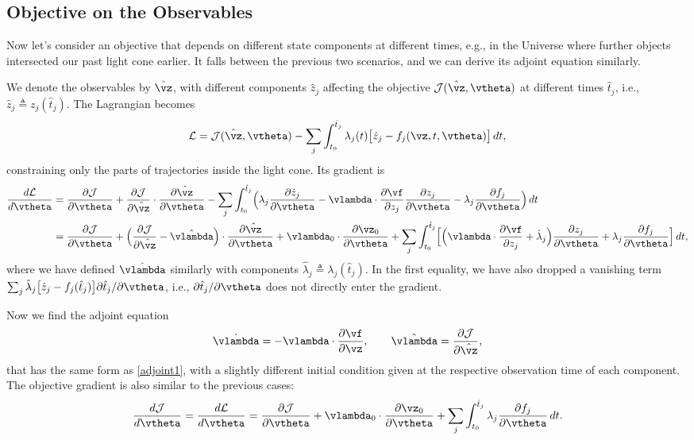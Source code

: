 \documentclass[modern, dvipsnames]{aastex631}
\renewcommand{\d}{d}
\newcommand{\p}{\partial}
\newcommand{\cJ}{\mathcal{J}}
\newcommand{\cL}{\mathcal{L}}
\begin{document}
\vspace{1em}
\subsection{Objective on the Observables}
\label{sec:lightcone}

Now let's consider an objective that depends on different state
components at different times, e.g., in the Universe where further
objects intersected our past light cone earlier.
It falls between the previous two scenarios, and we can derive its
adjoint equation similarly.

We denote the observables by $\hat\vz$, with different components $\hat
z_j$ affecting the objective $\cJ(\hat\vz, \vtheta)$ at different times
$\hat t_j$, i.e., $\hat z_j \triangleq z_j(\hat t_j)$.
The Lagrangian becomes
%
\begin{equation}
\cL = \cJ(\hat\vz, \vtheta)
- \sum_j \int_{t_0}^{\hat t_j} \lambda_j(t)
  \bigl[ \dot z_j - f_j(\vz, t, \vtheta) \bigr] \, \d t,
\end{equation}
%
constraining only the parts of trajectories inside the light cone.
Its gradient is
%
\begin{align}
\frac{\d\cL}{\d\vtheta}
&= \frac{\p\cJ}{\p\vtheta}
+ \frac{\p\cJ}{\p\hat\vz} \cdot \frac{\p\hat\vz}{\p\vtheta}
- \sum_j \int_{t_0}^{\hat t_j}
  \Bigl( \lambda_j \frac{\p\dot z_j}{\p\vtheta}
    - \vlambda \cdot \frac{\p\vf}{\p z_j} \frac{\p z_j}{\p\vtheta}
    - \lambda_j \frac{\p f_j}{\p\vtheta} \Bigr) \, \d t \\
%
&= \frac{\p\cJ}{\p\vtheta}
+ \Bigl( \frac{\p\cJ}{\p\hat\vz} - \hat\vlambda \Bigr)
  \cdot \frac{\p\hat\vz}{\p\vtheta}
+ \vlambda_0 \cdot \frac{\p\vz_0}{\p\vtheta}
+ \sum_j \int_{t_0}^{\hat t_j} \Bigl[
  \Bigl( \vlambda \cdot \frac{\p\vf}{\p z_j} + \dot\lambda_j \Bigr)
  \frac{\p z_j}{\p\vtheta}
  + \lambda_j \frac{\p f_j}{\p\vtheta} \Bigr] \, \d t, \nonumber
\end{align}
%
where we have defined $\hat\vlambda$ similarly with components
$\hat\lambda_j \triangleq \lambda_j(\hat t_j)$.
In the first equality, we have also dropped a vanishing term $\sum_j
\hat\lambda_j \bigl[ \dot z_j - f_j(\hat t_j) \bigr] \p\hat t_j /
\p\vtheta$, i.e., $\p\hat t_j / \p\vtheta$ does not directly enter the
gradient.

Now we find the adjoint equation
%
\begin{equation}
\dot\vlambda = - \vlambda \cdot \frac{\p\vf}{\p\vz},
\qquad
\hat\vlambda = \frac{\p\cJ}{\p\hat\vz},
\end{equation}
%
that has the same form as \eqref{adjoint1}, with a slightly different
initial condition given at the respective observation time of each
component.
The objective gradient is also similar to the previous cases:
%
\begin{equation}
\frac{\d\cJ}{\d\vtheta}
= \frac{\d\cL}{\d\vtheta}
= \frac{\p\cJ}{\p\vtheta} + \vlambda_0 \cdot \frac{\p\vz_0}{\p\vtheta}
+ \sum_j \int_{t_0}^{\hat t_j} \lambda_j \frac{\p f_j}{\p\vtheta} \, \d t.
\end{equation}
\end{document}

